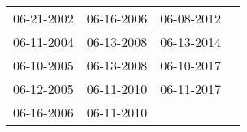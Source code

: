 \begin{supertabular}{llll}
 06-21-2002 &  06-16-2006 &  06-08-2012 \\
 06-11-2004 &  06-13-2008 &  06-13-2014 \\
 06-10-2005 &  06-13-2008 &  06-10-2017 \\
 06-12-2005 &  06-11-2010 &  06-11-2017 \\
 06-16-2006 &  06-11-2010 &             \\
\end{supertabular}
